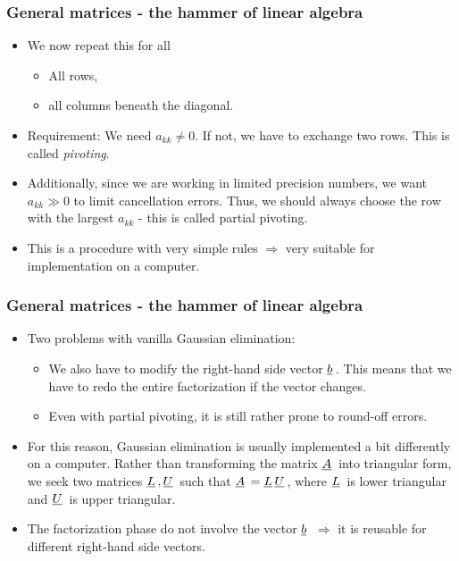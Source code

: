 \documentclass{beamer}
\newcommand{\ub}[1]{\underbar{$#1$}\,}
\begin{document}
\begin{frame}\frametitle{General matrices - the hammer of linear algebra}
  \begin{itemize}
    \item We now repeat this for all
      \begin{itemize}
        \item All rows,
        \item all columns beneath the diagonal.
      \end{itemize}
    \item Requirement: We need $a_{kk} \neq 0$. If not, we have to exchange two
      rows. This is called \emph{pivoting}.
    \item Additionally, since we are working in limited precision numbers, we want
      $a_{kk} \gg 0$ to limit cancellation errors. Thus, we should always choose
      the row with the largest $a_{kk}$ - this is called partial pivoting.
    \item This is a procedure with very simple rules $\Rightarrow$ very suitable for
      implementation on a computer.
  \end{itemize}
\end{frame}
\begin{frame}\frametitle{General matrices - the hammer of linear algebra}
  \begin{itemize}
    \item Two problems with vanilla Gaussian elimination:
      \begin{itemize}
        \item We also have to modify the right-hand side vector $\ub{b}$. This means
          that we have to redo the entire factorization if the vector changes.
        \item Even with partial pivoting, it is still rather prone to round-off errors.
      \end{itemize}
    \item For this reason, Gaussian elimination is usually implemented a bit differently
      on a computer. Rather than transforming the matrix $\ub{A}$ into triangular form,
      we seek two matrices $\ub{L}, \ub{U}$ such that $\ub{A} = \ub{L}\ub{U}$, where
      $\ub{L}$ is lower triangular and $\ub{U}$ is upper triangular.
    \item The factorization phase do not involve the vector $\ub{b}$ $\Rightarrow$
      it is reusable for different right-hand side vectors.
  \end{itemize}
\end{frame}
\end{document}
